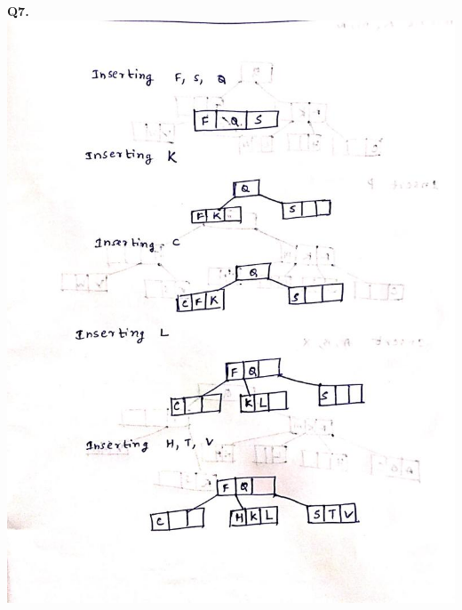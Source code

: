 \documentclass[11pt]{article}
\begin{document}
\vspace{5mm}
\hline
\vspace{5mm}
\textbf{Q7.}\\
\includegraphics[scale=0.4]{WhatsApp Image 2020-04-06 at 3.14.35 AM.jpeg}
\end{document}
